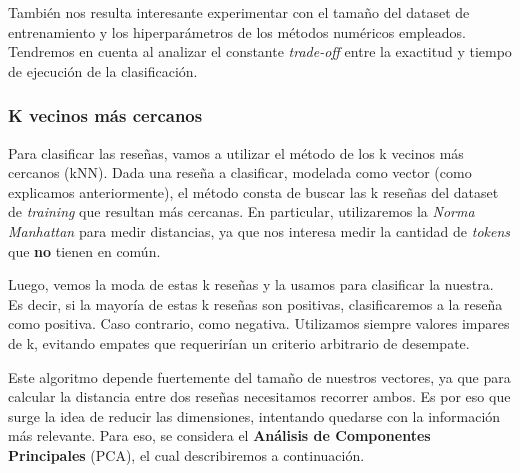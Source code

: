 También nos resulta interesante experimentar con el tamaño del dataset
de entrenamiento y los hiperparámetros de los métodos numéricos empleados.
Tendremos en cuenta al analizar el constante \textit{trade-off} entre la exactitud y tiempo de ejecución de la clasificación.

\subsubsection{K vecinos más cercanos}
\label{sec:knn}
Para clasificar las reseñas, vamos a utilizar el método de los k vecinos más cercanos (kNN).
Dada una reseña a clasificar, modelada como vector (como explicamos anteriormente),
el método consta de buscar las k reseñas del dataset de \textit{training} que
resultan más cercanas.
En particular, utilizaremos la \textit{Norma Manhattan} para medir distancias,
ya que nos interesa medir la cantidad de \textit{tokens} que \textbf{no} tienen en común.

Luego, vemos la moda de estas k reseñas y la usamos para clasificar la nuestra.
Es decir, si la mayoría de estas k reseñas son positivas, clasificaremos a la
reseña como positiva. Caso contrario, como negativa.
Utilizamos siempre valores impares de k, evitando empates que requerirían un
criterio arbitrario de desempate.


Este algoritmo depende fuertemente del tamaño de nuestros vectores, ya que
para calcular la distancia entre dos reseñas necesitamos recorrer ambos.
Es por eso que surge la idea de reducir las dimensiones, intentando quedarse
con la información más relevante. Para eso, se considera el
\textbf{Análisis de Componentes Principales} (PCA), el cual describiremos a continuación.

